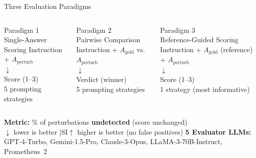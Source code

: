 \documentclass[aspectratio=169,10pt]{beamer}
\begin{document}
\begin{frame}{Three Evaluation Paradigms}
  \begin{columns}[T]
      \begin{block}{Paradigm 1\\Single-Answer Scoring}
        \centering
        \vspace{0.3em}
        Instruction + $A_{\text{perturb}}$\\
        $\downarrow$\\
        Score (1–3)\\
        \vspace{0.3em}
        \small 5 prompting strategies
      \end{block}

      \begin{block}{Paradigm 2\\Pairwise Comparison}
        \centering
        \vspace{0.3em}
        Instruction + $A_{\text{gold}}$ vs.\ $A_{\text{perturb}}$\\
        $\downarrow$\\
        Verdict (winner)\\
        \vspace{0.3em}
        \small 5 prompting strategies
      \end{block}

      \begin{block}{Paradigm 3\\Reference-Guided Scoring}
        \centering
        \vspace{0.3em}
        Instruction + $A_{\text{gold}}$ (reference) + $A_{\text{perturb}}$\\
        $\downarrow$\\
        Score (1–3)\\
        \vspace{0.3em}
        \small 1 strategy (most informative)
      \end{block}
  \end{columns}

  \vspace{0.7em}
  \begin{columns}[c]
      \textbf{Metric:} \% of perturbations \textbf{undetected} (score unchanged)\\
      $\downarrow$ lower is better \quad|\quad SI$\uparrow$ higher is better (no false positives)
      \small\textbf{5 Evaluator LLMs:} GPT-4-Turbo, Gemini-1.5-Pro, Claude-3-Opus, LLaMA-3-70B-Instruct, Prometheus~2
  \end{columns}
\end{frame}
\end{document}
